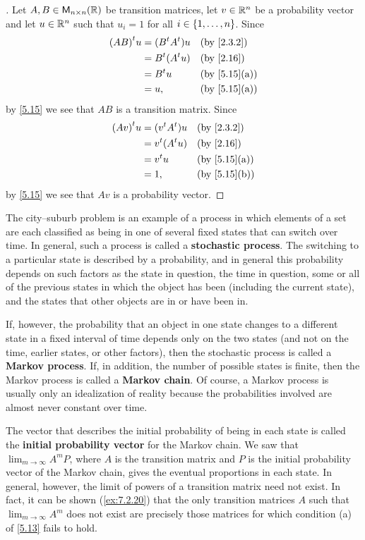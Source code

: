 \begin{proof}[]
	Let \(A, B \in \ms[n][n][\R]\) be transition matrices, let \(v \in \mathbb{R}^n\) be a probability vector and let \(u \in \mathbb{R}^n\) such that \(u_i = 1\) for all \(i \in \left\lbrace1, \dots, n\right\rbrace\).
	Since
	\begin{align*}
		\tp{(AB)} u & = (\tp{B} \tp{A}) u &  & \by{2.3.2}   \\
		            & = \tp{B} (\tp{A} u) &  & \by{2.16}    \\
		            & = \tp{B} u          &  & \by{5.15}[a] \\
		            & = u,                &  & \by{5.15}[a]
	\end{align*}
	by \cref{5.15} we see that \(AB\) is a transition matrix.
	Since
	\begin{align*}
		\tp{(Av)} u & = (\tp{v} \tp{A}) u &  & \by{2.3.2}   \\
		            & = \tp{v} (\tp{A} u) &  & \by{2.16}    \\
		            & = \tp{v} u          &  & \by{5.15}[a] \\
		            & = 1,                &  & \by{5.15}[b]
	\end{align*}
	by \cref{5.15} we see that \(Av\) is a probability vector.
\end{proof}

\begin{defn}\label{5.3.6}
	The city--suburb problem is an example of a process in which elements of a set are each classified as being in one of several fixed states that can switch over time.
	In general, such a process is called a \textbf{stochastic process}.
	The switching to a particular state is described by a probability, and in general this probability depends on such factors as the state in question, the time in question, some or all of the previous states in which the object has been (including the current state), and the states that other objects are in or have been in.

	If, however, the probability that an object in one state changes to a different state in a fixed interval of time depends only on the two states (and not on the time, earlier states, or other factors), then the stochastic process is called a \textbf{Markov process}.
	If, in addition, the number of possible states is finite, then the Markov process is called a \textbf{Markov chain}.
	Of course, a Markov process is usually only an idealization of reality because the probabilities involved are almost never constant over time.

	The vector that describes the initial probability of being in each state is called the \textbf{initial probability vector} for the Markov chain.
	We saw that \(\lim_{m \to \infty} A^m P\), where \(A\) is the transition matrix and \(P\) is the initial probability vector of the Markov chain, gives the eventual proportions in each state.
	In general, however, the limit of powers of a transition matrix need not exist.
	In fact, it can be shown (\cref{ex:7.2.20}) that the only transition matrices \(A\) such that \(\lim_{m \to \infty} A^m\) does not exist are precisely those matrices for which condition (a) of \cref{5.13} fails to hold.
\end{defn}

